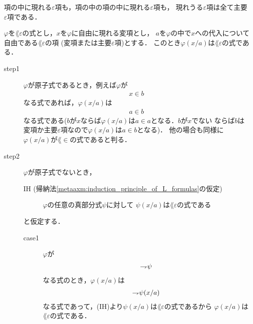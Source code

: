 	項の中に現れる$\varepsilon$項も，項の中の項の中に現れる$\varepsilon$項も，
	現れうる$\varepsilon$項は全て主要$\varepsilon$項である．
	
	\begin{screen}
		\begin{metathm}
		\label{metathm:substitutions_into_L_epsilon_formulas}
			$\varphi$を$\lang{\varepsilon}$の式とし，$x$を$\varphi$に自由に現れる変項とし，
			$a$を$\varphi$の中で$x$への代入について自由である$\lang{\varepsilon}$の項
			(変項または主要$\varepsilon$項)とする．
			このとき$\varphi(x/a)$は$\lang{\varepsilon}$の式である．
		\end{metathm}
	\end{screen}
	
	\begin{metaprf}\mbox{}
		\begin{description}
			\item[step1] $\varphi$が原子式であるとき，例えば$\varphi$が
				\begin{align}
					x \in b
				\end{align}
				なる式であれば，$\varphi(x/a)$は
				\begin{align}
					a \in b
				\end{align}
				なる式である($b$が$x$ならば$\varphi(x/a)$は$a \in a$となる．$b$が$x$でない
				ならば$b$は変項か主要$\varepsilon$項なので$\varphi(x/a)$は$a \in b$となる)．
				他の場合も同様に$\varphi(x/a)$が$\lang{\in}$の式であると判る．
			
			\item[step2] $\varphi$が原子式でないとき，
				\begin{description}
					\item[IH (帰納法\ref{metaaxm:induction_principle_of_L_formulas}の仮定)]
						$\varphi$の任意の真部分式$\psi$に対して
						$\psi(x/a)$は$\lang{\varepsilon}$の式である
				\end{description}
				と仮定する．
				\begin{description}
					\item[case1] $\varphi$が
						\begin{align}
							\rightharpoondown\hspace{-0.25em} \psi
						\end{align}
						なる式のとき，$\varphi(x/a)$は
						\begin{align}
							\rightharpoondown\hspace{-0.25em} \psi(x/a)
						\end{align}
						なる式であって，(IH)より$\psi(x/a)$は$\lang{\varepsilon}$の式であるから
						$\varphi(x/a)$は$\lang{\varepsilon}$の式である．
						

\end{description}
\end{description}
\end{metaprf}
